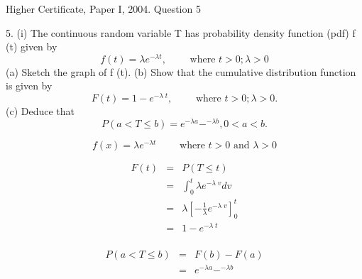 \documentclass[a4paper,12pt]{article}
\begin{document}
Higher Certificate, Paper I, 2004. Question 5
\begin{framed}
5. (i) The continuous random variable T has probability density function (pdf) f (t)
given by
\[f (t ) =\lambda e^{-\lambda t} , \qquad  \mbox{ where } t > 0; \lambda > 0\]
(a) Sketch the graph of f (t).
(b) Show that the cumulative distribution function is given by
\[F (t ) = 1- e^{-\lambda \; t} , \qquad  \mbox{ where } t > 0; \lambda > 0 .\]
(c) Deduce that
\[P(a < T \leq b) = e^{-\lambda a} - ^{-\lambda b} , 0 < a < b.\]

\[f(x) = \lambda e^{-\lambda t} \qquad \mbox{ where } t >0 \mbox{ and } \lambda >0 \]


\begin{eqnarray*}
F(t) &=& P(T \leq t) \\
&=& \int^{t}_{0} \lambda e^{-\lambda \; v} dv \\
&=& \lambda \left[  -\frac{1}{\lambda} e^{-\lambda \; v} \right]^{t}_{0} \\
&=& 1- e^{-\lambda \; t}\\
\end{eqnarray*}


\begin{eqnarray*}
P(a < T \leq b) &=& F(b) - F(a) \\
&=& e^{-\lambda a} - ^{-\lambda b}
\end{eqnarray*}


\end{framed}
\end{document}
